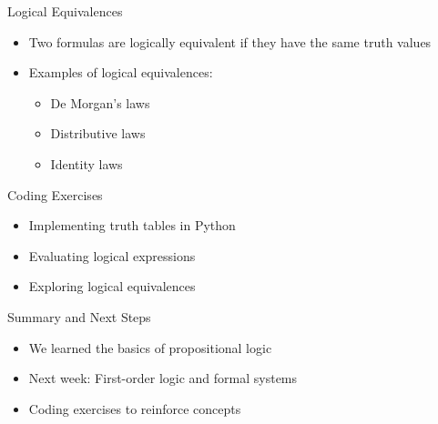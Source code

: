 \documentclass[presentation]{beamer}
\begin{document}
\begin{frame}[label={sec:org10bf711}]{Logical Equivalences}
\begin{itemize}
\item Two formulas are logically equivalent if they have the same truth values
\item Examples of logical equivalences:
\begin{itemize}
\item De Morgan's laws
\item Distributive laws
\item Identity laws
\end{itemize}
\end{itemize}
\end{frame}

\begin{frame}[label={sec:org4260d07}]{Coding Exercises}
\begin{itemize}
\item Implementing truth tables in Python
\item Evaluating logical expressions
\item Exploring logical equivalences
\end{itemize}
\end{frame}

\begin{frame}[label={sec:org524e8ff}]{Summary and Next Steps}
\begin{itemize}
\item We learned the basics of propositional logic
\item Next week: First-order logic and formal systems
\item Coding exercises to reinforce concepts
\end{itemize}
\end{frame}
\end{document}
